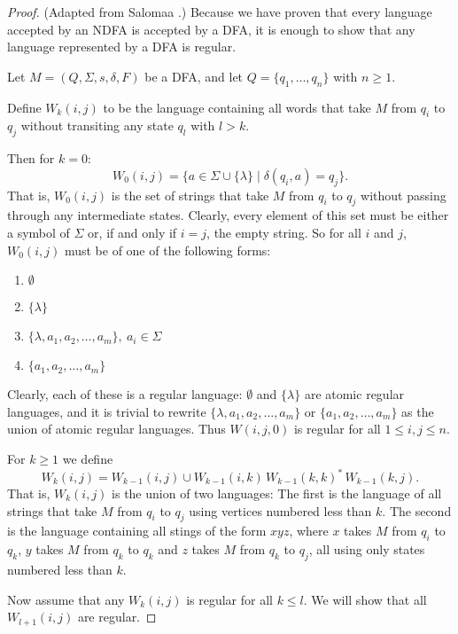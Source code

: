 \documentclass{bcthesis}
\newcommand{\footcite}[2]{\xspace\cite[pg.~{#2}]{#1}\xspace}
\begin{document}
	\begin{proof}
		(Adapted from Salomaa \footcite{salomaa}{29}.)
		Because we have proven that every language accepted by an NDFA is accepted by a DFA, it is enough to show that any language represented by a DFA is regular.

		Let $M = (Q, \Sigma, s, \delta, F)$ be a DFA, and let $Q = \{ q_1, \dots, q_n \}$ with $n \geq 1$.

		Define $W_k(i, j)$ to be the language containing all words that take $M$ from $q_i$ to $q_j$ without transiting any state $q_l$ with $l > k$.

		Then for $k = 0$:
		\[
			W_0(i, j) = \{ a \in \Sigma \cup \{ \lambda \} \mid \delta(q_i, a) = q_j \}.
		\]
		That is, $W_0(i, j)$ is the set of strings that take $M$ from $q_i$ to $q_j$ without passing through any intermediate states.
		Clearly, every element of this set must be either a symbol of $\Sigma$ or, if and only if $i = j$, the empty string.
		So for all $i$ and $j$, $W_0(i, j)$ must be of one of the following forms:
		\begin{enumerate}[label=(\roman*), itemsep = -0.3 ex, nolistsep]
			\item $\emptyset$
			\item $\{ \lambda \}$
			\item $\{ \lambda, a_1, a_2, \dots, a_m \}, \ a_i \in \Sigma$
			\item $\{ a_1, a_2, \dots, a_m \}$
		\end{enumerate}
		Clearly, each of these is a regular language:
		$\emptyset$ and $\{ \lambda \}$ are atomic regular languages, and it is trivial to rewrite $\{ \lambda, a_1, a_2, \dots, a_m \}$ or $\{ a_1, a_2, \dots, a_m \}$ as the union of atomic regular languages.
		Thus $W(i, j, 0)$ is regular for all $1 \leq i, j \leq n$.

		For $k \geq 1$ we define
		\[
			W_k(i, j) = W_{k-1}(i, j) \cup W_{k-1}(i, k)\, W_{k-1}(k, k)^*\, W_{k-1}(k, j).
		\]
		That is, $W_k(i, j)$ is the union of two languages:
		The first is the language of all strings that take $M$ from $q_i$ to $q_j$ using vertices numbered less than $k$.
		The second is the language containing all stings of the form $xyz$, where $x$ takes $M$ from $q_i$ to $q_k$, $y$ takes $M$ from $q_k$ to $q_k$ and $z$ takes $M$ from $q_k$ to $q_j$, all using only states numbered less than $k$.

		Now assume that any $W_k(i, j)$ is regular for all $k \leq l$.
		We will show that all $W_{l+1}(i, j)$ are regular.


\end{proof}
\end{document}
